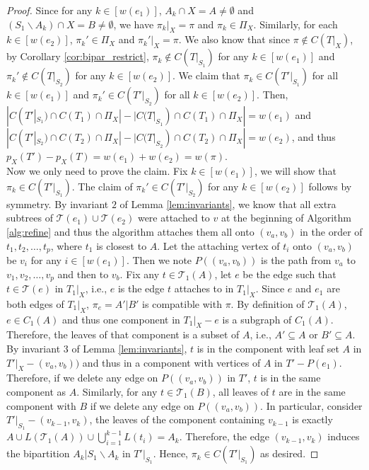\documentclass{bmcart}
\begin{document}
\begin{proof}
    Since for any $k \in [w(e_1)]$, $A_k \cap X = A \neq \emptyset$ and $(S_1 \backslash A_k) \cap X = B \neq \emptyset$, we have $\pi_k |_X = \pi$ and $\pi_k \in \Pi_X$. Similarly, for each $k \in [w(e_2)]$, $\pi_k' \in \Pi_X$ and $\pi_k'|_X = \pi$. We also know that since $\pi \notin C(T|_X)$, by Corollary \ref{cor:bipar_restrict}, $\pi_k \notin C(T|_{S_1})$ for any $k \in [w(e_1)]$ and $\pi_k' \notin C(T|_{S_2})$ for any $k \in [w(e_2)]$. We claim that $\pi_k \in C(T'|_{S_1})$ for all $k \in [w(e_1)]$ and $\pi_k' \in C(T'|_{S_2})$ for all $k \in [w(e_2)]$. Then, $|C(T'|_{S_1})\cap C(T_1) \cap \Pi_X| - |C(T|_{S_1})\cap C(T_1) \cap \Pi_X| = w(e_1)$ and $|C(T'|_{S_2}) \cap C(T_2) \cap \Pi_X| - |C(T|_{S_2}) \cap C(T_2) \cap \Pi_X| = w(e_2)$, and thus $p_X(T') - p_X(T) = w(e_1) + w(e_2) = w(\pi)$. \\
    
    Now we only need to prove the claim. Fix $k \in [w(e_1)]$, we will show that $\pi_k \in C(T'|_{S_1})$. The claim of $\pi_k' \in C(T'|_{S_2})$ for any $k \in [w(e_2)]$ follows by symmetry.  By invariant $2$ of Lemma \ref{lem:invariants}, we know that all extra subtrees of $\mathcal{T}(e_1) \cup \mathcal{T}(e_2)$ were attached to $v$ at the beginning of Algorithm \ref{alg:refine} and thus the algorithm attaches them all onto $(v_a, v_b)$ in the order of $t_1,t_2,\dots,t_p$, where $t_1$ is closest to $A$. Let the attaching vertex of $t_i$ onto $(v_a, v_b)$ be $v_i$ for any $i \in [w(e_1)]$. Then we note $P( (v_a,v_b) )$ is the path from $v_a$ to $v_1,v_2,\dots, v_p$ and then to $v_b$. Fix any $t \in \mathcal{T}_1(A)$, let $e$ be the edge such that $t \in \mathcal{T}(e)$ in $T_1|_X$, i.e., $e$ is the edge $t$ attaches to in $T_1|_X$. Since $e$ and $e_1$ are both edges of $T_1|_X$, $\pi_e = A'|B'$ is compatible with $\pi$. By definition of $\mathcal{T}_1(A)$, $e \in C_1(A)$ and thus one component in $T_1|_X - e$ is a subgraph of $C_1(A)$. Therefore, the leaves of that component is a subset of $A$, i.e., $A' \subseteq A$ or $B' \subseteq A$. By invariant $3$ of Lemma \ref{lem:invariants}, $t$ is in the component with leaf set $A$ in $T'|_X - (v_a,v_b))$ and thus in a component with vertices of $A$ in $T'-P(e_1)$. Therefore, if we delete any edge on $P( (v_a,v_b) )$ in $T'$, $t$ is in the same component as $A$. Similarly, for any $t \in \mathcal{T}_1(B)$, all leaves of $t$ are in the same component with $B$ if we delete any edge on $P( (v_a,v_b) )$. In particular, consider $T'|_{S_1} - (v_{k-1}, v_k)$, the leaves of the component containing $v_{k-1}$ is exactly $A \cup L(\mathcal{T}_1(A)) \cup  \bigcup_{i = 1}^{k-1}L(t_i) = A_k$. Therefore, the edge $(v_{k-1},v_k)$ induces the bipartition $A_k | S_1 \backslash A_k$ in $T'|_{S_1}$. Hence, $\pi_k \in C(T'|_{S_1})$ as desired. 
\end{proof}
\end{document}
